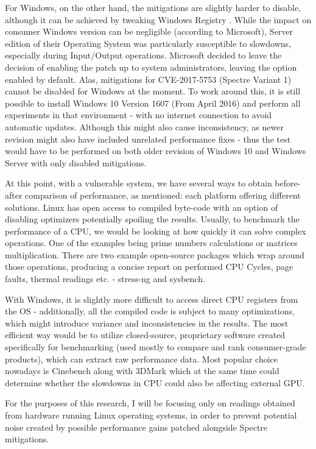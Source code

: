 \documentclass{csfourzero}
\begin{document}
For Windows, on the other hand, the mitigations are slightly harder to disable, although it can be achieved by tweaking Windows Registry \cite{msoft}. While the impact on consumer Windows version can be negligible (according to Microsoft\cite{myerson2018understanding}), Server edition of their Operating System was particularly susceptible to slowdowns, especially during Input/Output operations. Microsoft decided to leave the decision of enabling the patch up to system administrators, leaving the option enabled by default. Alas, mitigations for CVE-2017-5753 (Spectre Variant 1) cannot be disabled for Windows at the moment. To work around this, it is still possible to install Windows 10 Version 1607 (From April 2016) and perform all experiments in that environment - with no internet connection to avoid automatic updates. Although this might also cause inconsistency, as newer revision might also have included unrelated performance fixes - thus the test would have to be performed on both older revision of Windows 10 and Windows Server with only disabled mitigations.

At this point, with a vulnerable system, we have several ways to obtain before-after comparison of performance, as mentioned: each platform offering different solutions. Linux has open access to compiled byte-code with an option of disabling optimizers potentially spoiling the results. Usually, to benchmark the performance of a CPU, we would be looking at how quickly it can solve complex operations. One of the examples being prime numbers calculations or matrices multiplication. There are two example open-source packages which wrap around those operations, producing a concise report on performed CPU Cycles, page faults, thermal readings etc. - stress-ng \cite{stressng} and sysbench. \cite{sysbench}  

With Windows, it is slightly more difficult to access direct CPU registers from the OS - additionally, all the compiled code is subject to many optimizations, which might introduce variance and inconsistencies in the results. The most efficient way would be to utilize closed-source, proprietary software created specifically for benchmarking (used mostly to compare and rank consumer-grade products), which can extract raw performance data. Most popular choice nowadays is Cinebench along with 3DMark which at the same time could determine whether the slowdowns in CPU could also be affecting external GPU.

For the purposes of this research, I will be focusing only on readings obtained from hardware running Linux operating systems, in order to prevent potential noise created by possible performance gains patched alongside Spectre mitigations.
\end{document}
